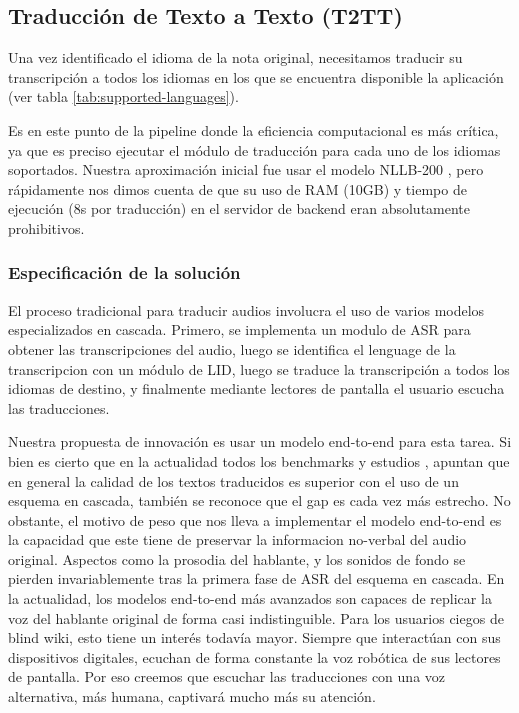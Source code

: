 \subsection{Traducción de Texto a Texto (T2TT)}
Una vez identificado el idioma de la nota original, necesitamos traducir su transcripción a todos los idiomas en los que se encuentra disponible la aplicación (ver tabla \ref{tab:supported-languages}). 

Es en este punto de la pipeline donde la eficiencia computacional es más crítica, ya que es preciso ejecutar el módulo de traducción para cada uno de los idiomas soportados. Nuestra aproximación inicial fue usar el modelo NLLB-200 \cite{ott2020nllb}, pero rápidamente nos dimos cuenta de que su uso de RAM (10GB) y tiempo de ejecución (8s por traducción) en el servidor de backend eran absolutamente prohibitivos.



\subsubsection{Especificación de la solución}

El proceso tradicional para traducir audios involucra el uso de varios modelos especializados en cascada. Primero, se implementa un modulo de ASR para obtener las transcripciones del audio, luego se identifica el lenguage de la transcripcion con un módulo de LID, luego se traduce la transcripción a todos los idiomas de destino, y finalmente mediante lectores de pantalla el usuario escucha las traducciones.

Nuestra propuesta de innovación es usar un modelo end-to-end para esta tarea. Si bien es cierto que en la actualidad todos los benchmarks \cite{iwslt-findings} y estudios \cite{etchegoyhen2022cascade}, \cite{Sethiya2025} apuntan que en general la calidad de los textos traducidos es superior con el uso de un esquema en cascada, también se reconoce que el gap es cada vez más estrecho.
No obstante, el motivo de peso que nos lleva a implementar el modelo end-to-end es la capacidad que este tiene de preservar la informacion no-verbal del audio original. Aspectos como la prosodia del hablante, y los sonidos de fondo se pierden invariablemente tras la primera fase de ASR del esquema en cascada. En la actualidad, los modelos end-to-end más avanzados son capaces de replicar la voz del hablante original de forma casi indistinguible.  
Para los usuarios ciegos de blind wiki, esto tiene un interés todavía mayor. Siempre que interactúan con sus dispositivos digitales, ecuchan de forma constante la voz robótica de sus lectores de pantalla. Por eso creemos que escuchar las traducciones con una voz alternativa, más humana, captivará mucho más su atención. 

